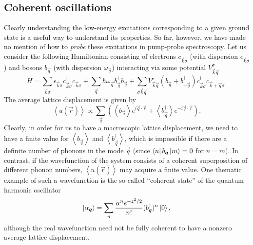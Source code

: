 \subsection{Coherent oscillations}

Clearly understanding the low-energy excitations corresponding to a given ground state is a useful way to understand its properties.
So far, however, we have made no mention of how to \emph{probe} these excitations in pump-probe spectroscopy.
Let us consider the following Hamiltonian consisting of electrons $c_{\vec{k}\sigma}$ (with dispersion $\epsilon_{\vec{k}\sigma}$) and bosons $b_{\vec{q}}$ (with dispersion $\omega_{\vec{q}}$) interacting via some potential $V^\sigma_{\vec{k}\vec{q}}$
\begin{equation}\label{eq:electronlatticehamiltonian}
H = \sum_{\vec{k}\sigma}\epsilon_{\vec{k}\sigma}c^\dagger_{\vec{k}\sigma}c_{\vec{k}\sigma}
+\sum_{\vec{q}}\hbar \omega_{\vec{q}}b^\dagger_{\vec{q}}b_{\vec{q}}
+\sum_{\sigma\vec{k}\vec{q}}V^\sigma_{\vec{k}\vec{q}}\left(b_{\vec{q}}+b^\dagger_{-\vec{q}}\right)c^\dagger_{\vec{k}\sigma}c_{\vec{k}+\vec{q}\sigma}.
\end{equation}
The average lattice displacement is given by
\begin{equation}
\left<u(\vec{r})\right> \propto \sum_{\vec{q}}\left(\left<b_{\vec{q}}\right>e^{i\vec{q}\cdot\vec{r}}+\left<b^\dagger_{\vec{q}}\right>e^{-i\vec{q}\cdot\vec{r}}\right).
\end{equation}
Clearly, in order for us to have a macroscopic lattice displacement, we need to have a finite value for $\left<b_{\vec{q}}\right>$ and $\left<b^\dagger_{\vec{q}}\right>$, which is impossible if there are a definite number of phonons in the mode $\vec{q}$ (since $\bra{n}b_{\bm{q}}\ket{m}=0$ for $n=m$).
In contrast, if the wavefunction of the system consists of a coherent superposition of different phonon numbers, $\left<u(\vec{r})\right>$ may acquire a finite value.
One thematic example of such a wavefunction is the so-called ``coherent state'' of the quantum harmonic oscillator
\begin{equation}\label{eq:coherentstate}
\ket{\alpha_{\bm{q}}} = \sum_n \frac{\alpha^ne^{-z^2/2}}{n!}(b^\dagger_{\bm{q}})^n\ket{0},
\end{equation}
although the real wavefunction need not be fully coherent to have a nonzero average lattice displacement.

